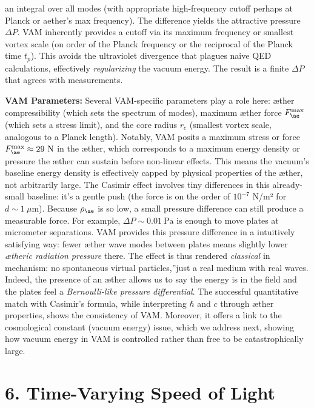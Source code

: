 \documentclass[a4paper, aps,preprint,superscriptaddress, 12pt]{revtex4}
\begin{document}
an integral over all modes (with appropriate high-frequency cutoff perhaps at Planck or aether's max frequency). The difference yields the attractive pressure $\Delta P$. VAM inherently provides a cutoff via its maximum frequency or smallest vortex scale (on order of the Planck frequency or the reciprocal of the Planck time $t_p$). This avoids the ultraviolet divergence that plagues naive QED calculations, effectively \textit{regularizing} the vacuum energy. The result is a finite $\Delta P$ that agrees with measurements.


\textbf{VAM Parameters:} Several VAM-specific parameters play a role here: æther compressibility (which sets the spectrum of modes), maximum æther force $F_{\ae}^{\max}$ (which sets a stress limit), and the core radius $r_c$ (smallest vortex scale, analogous to a Planck length). Notably, VAM posits a maximum stress or force $F_{\ae}^{\max}\approx29~\text{N}$ in the æther, which corresponds to a maximum energy density or pressure the æther can sustain before non-linear effects. This means the vacuum's baseline energy density is effectively capped by physical properties of the æther, not arbitrarily large. The Casimir effect involves tiny differences in this already-small baseline: it's a gentle push (the force is on the order of $10^{-7}$ N/m² for $d\sim1~\mu$m). Because $\rho_{\ae}$ is so low, a small pressure difference can still produce a measurable force. For example, $\Delta P \sim 0.01~\text{Pa}$ is enough to move plates at micrometer separations. VAM provides this pressure difference in a intuitively satisfying way: fewer æther wave modes between plates means slightly lower \textit{ætheric radiation pressure} there. The effect is thus rendered \textit{classical} in mechanism: no spontaneous \grqq virtual particles,\textquotedblright just a real medium with real waves. Indeed, the presence of an æther allows us to say the energy is in the field and the plates feel a \textit{Bernoulli-like pressure differential}. The successful quantitative match with Casimir's formula, while interpreting $\hbar$ and $c$ through æther properties, shows the consistency of VAM. Moreover, it offers a link to the cosmological constant (vacuum energy) issue, which we address next, showing how vacuum energy in VAM is controlled rather than free to be catastrophically large.


\section*{6. Time-Varying Speed of Light}
\end{document}
